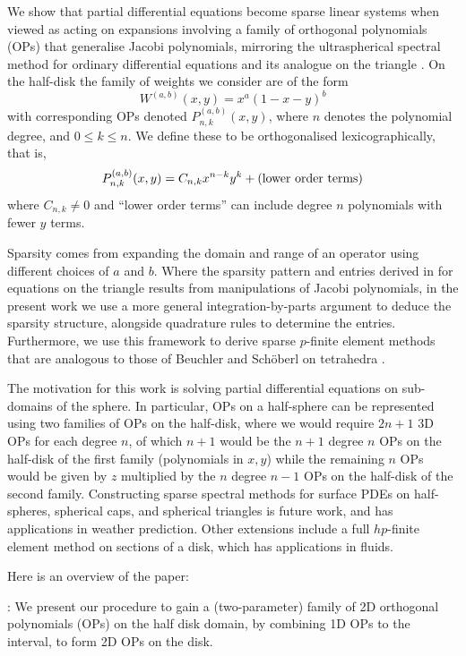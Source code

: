 \documentclass[11pt, oneside]{article}   	%
\begin{document}
We show that partial differential equations become sparse linear systems when viewed as acting on expansions involving a family of orthogonal polynomials (OPs) that  generalise Jacobi polynomials, mirroring the ultraspherical spectral method for ordinary differential equations \cite{olver2013fast} and its analogue on the triangle \cite{olver2018recurrence,olver2019triangle}.  On the half-disk the family of weights we consider are of the form
$$
W^{(a,b)}(x,y) = x^a (1-x-y)^b
$$
with corresponding OPs denoted $P_{n,k}^{(a,b)}(x,y)$, where $n$ denotes the polynomial degree, and $0 \le k \le n$. We define these to be orthogonalised lexicographically, that is,
$$
P_{n,k}^{(a,b)}(x,y) = C_{n,k} x^{n-k} y^k + (\hbox{lower order terms})
$$
where $C_{n,k} \neq 0$ and ``lower order terms'' can  include degree $n$ polynomials with fewer $y$ terms.

Sparsity comes from expanding the domain and range of an operator  using different choices of $a$ and $b$. Where the sparsity pattern and entries derived in \cite{olver2018recurrence,olver2019triangle} for equations on the triangle  results from manipulations of Jacobi polynomials, in the present work we use a more general integration-by-parts argument to deduce the sparsity structure, alongside quadrature rules to determine the entries.  Furthermore, we use this framework to derive sparse $p$-finite element methods that are analogous to those of Beuchler and Sch\"oberl on tetrahedra \cite{beuchler2006new}. 

The motivation for this work is solving partial differential equations on sub-domains of the sphere. In particular, OPs on a half-sphere can be represented using two families of OPs on the half-disk, where we would require $2n+1$ 3D OPs for each degree $n$, of which $n+1$ would be the $n+1$ degree $n$ OPs on the half-disk of the first family (polynomials in $x,y$) while the remaining $n$ OPs would be given by $z$ multiplied by the $n$ degree $n-1$ OPs on the half-disk of the second family. Constructing sparse spectral methods for surface PDEs on half-spheres, spherical caps, and spherical triangles is future work, and has applications in weather prediction. Other extensions include a full $hp$-finite element method on sections of a disk, which has applications in fluids. 

Here is an overview of the paper:  

\noindent {}: We present our procedure  to gain a (two-parameter) family of 2D orthogonal polynomials (OPs) on the half disk domain, by combining 1D OPs to the interval, to form 2D OPs on the disk. 
\end{document}
